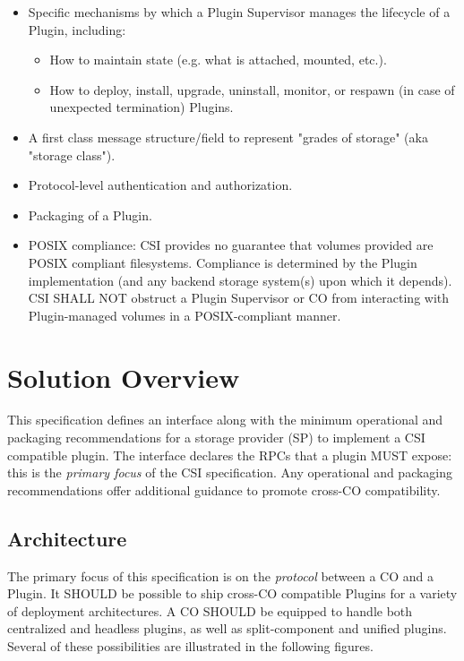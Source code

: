 \documentclass[12pt]{article}
\begin{document}
\begin{itemize}
  \item Specific mechanisms by which a Plugin Supervisor manages the
    lifecycle of a Plugin, including:
  \begin{itemize}
    \item How to maintain state (e.g. what is attached, mounted, etc.).
    \item How to deploy, install, upgrade, uninstall, monitor, or
      respawn (in case of unexpected termination) Plugins.
  \end{itemize}
  \item A first class message structure/field to represent "grades of
    storage" (aka "storage class").
  \item Protocol-level authentication and authorization.
  \item Packaging of a Plugin.
  \item POSIX compliance: CSI provides no guarantee that volumes
    provided are POSIX compliant filesystems. Compliance is determined
    by the Plugin implementation (and any backend storage system(s) upon
    which it depends). CSI SHALL NOT obstruct a Plugin Supervisor or CO
    from interacting with Plugin-managed volumes in a POSIX-compliant
    manner.
\end{itemize}

\newpage
\section{Solution Overview}

This specification defines an interface along with the minimum
operational and packaging recommendations for a storage provider (SP) to
implement a CSI compatible plugin. The interface declares the RPCs that
a plugin MUST expose: this is the \emph{primary focus} of the CSI
specification. Any operational and packaging recommendations offer
additional guidance to promote cross-CO compatibility.

\subsection{Architecture}

The primary focus of this specification is on the \emph{protocol}
between a CO and a Plugin. It SHOULD be possible to ship cross-CO
compatible Plugins for a variety of deployment architectures. A CO
SHOULD be equipped to handle both centralized and headless plugins, as
well as split-component and unified plugins. Several of these
possibilities are illustrated in the following figures.
\end{document}
